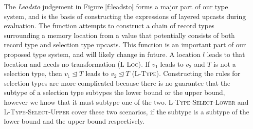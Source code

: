\documentclass[11pt
              , a4paper
              , twoside
              , openright
              ]{report}
\numberwithin{case}{theorem}
\numberwithin{subcase}{case}
\begin{document}
The \emph{Leadsto} judgement in Figure \ref{f:leadsto} forms a major part of our type system, and is the basis of constructing the expressions of layered upcasts during evaluation. The function attempts to construct a chain of record types surrounding a memory location from a value that potentially consists of both record type and selection type upcasts. This function is an important part of our proposed type system, and will likely change in future. A location $l$ leads to that location and needs no transformation (\textsc{L-Loc}). If $v_1$ leads to $v_2$ and $T$ is not a selection type, then $v_1 \unlhd T$ leads to $v_2 \unlhd T$ (\textsc{L-Type}). Constructing the rules for selection types are more complicated because there is no guarantee that the subtype of a selection type subtypes the lower bound or the upper bound, however we know that it must subtype one of the two. \textsc{L-Type-Select-Lower} and \textsc {L-Type-Select-Upper} cover these two scenarios, if the subtype is a subtype of the lower bound and the upper bound respectively.
\end{document}
